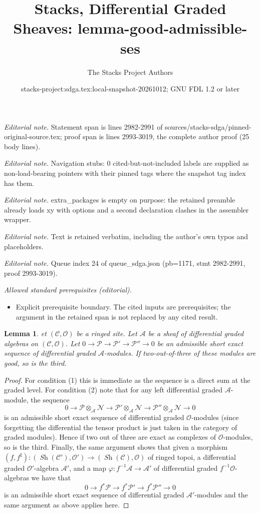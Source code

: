 \documentclass[10pt,a4paper]{amsart}
\title{Stacks, Differential Graded Sheaves: lemma-good-admissible-ses}
\author{The Stacks Project Authors}
\date{stacks-project:sdga.tex:local-snapshot-20261012; GNU FDL 1.2 or later}
\theoremstyle{plain}
\newtheorem{lemma}[subsection]{Lemma}
\theoremstyle{definition}
\theoremstyle{remark}
\numberwithin{equation}{subsection}
\def\Sh{\mathop{\mathit{Sh}}\nolimits}
\begin{document}
\maketitle
\noindent\textit{Editorial note.} Statement span is lines 2982-2991 of sources/stacks-sdga/pinned-original-source.tex; proof span is lines 2993-3019, the complete author proof (25 body lines).\par\medskip
\noindent\textit{Editorial note.} Navigation stubs: 0 cited-but-not-included labels are supplied as non-load-bearing pointers with their pinned tags where the snapshot tag index has them.\par\medskip
\noindent\textit{Editorial note.} extra\_packages is empty on purpose: the retained preamble already loads xy with options and a second declaration clashes in the assembler wrapper.\par\medskip
\noindent\textit{Editorial note.} Text is retained verbatim, including the author's own typos and placeholders.\par\medskip
\noindent\textit{Editorial note.} Queue index 24 of queue\_sdga.json (pb=1171, stmt 2982-2991, proof 2993-3019).\par\medskip
\noindent\textit{Allowed standard prerequisites (editorial).}\begin{itemize}
\item Explicit prerequisite boundary. The cited inputs are prerequisites; the argument in the retained span is not replaced by any cited result.
\end{itemize}\medskip
\begin{lemma}
\label{lemma-good-admissible-ses}
et $(\mathcal{C}, \mathcal{O})$ be a ringed site.
Let $\mathcal{A}$ be a sheaf of differential graded algebras
on $(\mathcal{C}, \mathcal{O})$. Let
$0 \to \mathcal{P} \to \mathcal{P}' \to \mathcal{P}'' \to 0$
be an admissible short exact sequence of differential graded
$\mathcal{A}$-modules. If two-out-of-three of these modules
are good, so is the third.
\end{lemma}

\begin{proof}
For condition (1) this is immediate as the sequence is a direct sum
at the graded level. For condition (2) note that for any
left differential graded $\mathcal{A}$-module, the sequence
$$
0 \to 
\mathcal{P} \otimes_\mathcal{A} \mathcal{N} \to
\mathcal{P}' \otimes_\mathcal{A} \mathcal{N} \to
\mathcal{P}'' \otimes_\mathcal{A} \mathcal{N} \to 0
$$
is an admissible short exact sequence of differential graded
$\mathcal{O}$-modules (since forgetting the differential
the tensor product is just taken in the category of graded modules).
Hence if two out of three are exact as complexes of $\mathcal{O}$-modules,
so is the third. Finally, the same argument shows that given
a morphism $(f, f^\sharp) : (\Sh(\mathcal{C}'), \mathcal{O}')
\to (\Sh(\mathcal{C}), \mathcal{O})$
of ringed topoi, a differential graded $\mathcal{O}'$-algebra
$\mathcal{A}'$, and a map $\varphi : f^{-1}\mathcal{A} \to \mathcal{A}'$
of differential graded $f^{-1}\mathcal{O}$-algebras
we have that
$$
0 \to f^*\mathcal{P} \to f^*\mathcal{P}' \to f^*\mathcal{P}'' \to 0
$$
is an admissible short exact sequence of differential graded
$\mathcal{A}'$-modules and the same argument as above applies here.
\end{proof}
\end{document}
